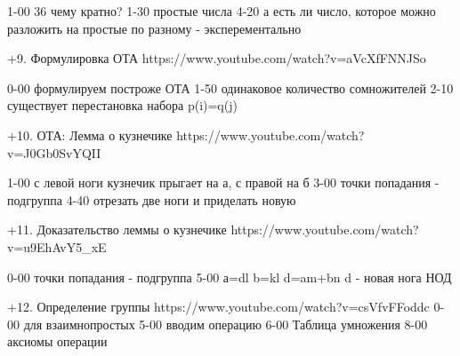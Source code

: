 1-00 36 чему кратно?
1-30 простые числа
4-20 а есть ли число, которое можно разложить на простые по разному - эксперементально

+9. Формулировка ОТА
https://www.youtube.com/watch?v=aVcXfFNNJSo

0-00 формулируем построже ОТА
1-50 одинаковое количество сомножителей
2-10 существует перестановка набора p(i)=q(j)

+10. ОТА: Лемма о кузнечике
https://www.youtube.com/watch?v=J0Gb0SvYQII

1-00 с левой ноги кузнечик прыгает на а, с правой на б
3-00 точки попадания - подгруппа
4-40 отрезать две ноги и приделать новую

+11. Доказательство леммы о кузнечике
https://www.youtube.com/watch?v=u9EhAvY5_xE

0-00 точки попадания - подгруппа
5-00 а=dl b=kl d=am+bn d - новая нога НОД

+12. Определение группы
https://www.youtube.com/watch?v=csVfvFFoddc
0-00 для взаимнопростых
5-00 вводим операцию
6-00 Таблица умножения
8-00 аксиомы операции
